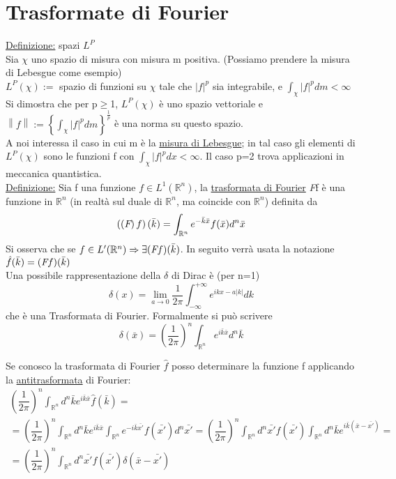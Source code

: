 \documentclass[a4paper,11pt]{report}
\newcommand{\R}{\mathbb{R}}
\newcommand{\Rn}{\mathbb{R}^n}
\newcommand{\fourier}{\emph{F}}
\newcommand{\x}{\bar{x}}
\newcommand{\kk}{\bar{k}}
\begin{document}
\section{Trasformate di Fourier}
\underline{Definizione:} spazi $L^P$ \\
Sia $\chi$ uno spazio di misura con misura m positiva. (Possiamo prendere la misura di Lebesgue come esempio)\\
$L^P(\chi):=$ spazio di funzioni su $\chi$ tale che $|f|^p$ sia integrabile, e $\int_{\chi}|f|^p dm < \infty$\\
Si dimostra che per p$\geq$1, $L^P(\chi)$ è uno spazio vettoriale e $\left\|f\right\| := \left\{ \int_{\chi} |f|^p dm\right\}^{\frac{1}{p}}$ è una norma su questo spazio.\\
A noi interessa il caso in cui m è la \underline{misura di Lebesgue}; in tal caso gli elementi di $L^P(\chi)$ sono le funzioni f con $\int_{\chi}|f|^p dx < \infty$.
Il caso p=2 trova applicazioni in meccanica quantistica.\\
\underline{Definizione:} Sia f una funzione $f\in L^1 (\Rn)$, la \underline{trasformata di Fourier} \fourier f è una funzione in $\Rn$ (in realtà sul duale di $\R^n$, ma coincide con $\R^n$) definita da 
\begin{equation}
\left(\left(\fourier \right)f\right)(\kk) = \int_{\Rn}e^{-\bar{k}\bar{x}}f(\bar{x})d^n\bar{x} 
\end{equation}
Si osserva che se $f\in L'(\Rn) \Rightarrow \exists (\fourier f)(\bar{k})$. In seguito verrà usata la notazione $\hat{f}(\bar{k})=(\fourier f)(\bar{k})$\\
Una possibile rappresentazione della $\delta$ di Dirac è (per n=1)
$$
	\delta(x)=\lim_{a \to 0} \dfrac{1}{2\pi} \int_{-\infty}^{+\infty} e^{ikx-a\left | k\right |}dk
$$
che è una Trasformata di Fourier. Formalmente si può scrivere
\begin{equation}
\delta(\x)=\left(\dfrac{1}{2\pi}\right)^n\int_{\Rn}e^{i\kk\x}d^n\kk
\end{equation}

Se conosco la trasformata di Fourier $\hat{f}$ posso determinare la funzione f applicando la \underline{antitrasformata} di Fourier:
\begin{multline*}
\left(\dfrac{1}{2\pi}\right)^n\int_{\Rn}d^n\bar{k}e^{i\bar{k}\bar{x}}\hat{f}(\bar{k})=\\
=\left(\dfrac{1}{2\pi}\right)^n \int_{\Rn}d^n\bar{k}e^{i\bar{k}\bar{x}}\int_{\Rn}e^{-i\bar{k}\bar{x'}}f(\bar{x'})d^n\bar{x'}= \left(\dfrac{1}{2\pi}\right)^n\int_{\Rn}d^n\bar{x'}f(\bar{x'})\int_{\Rn}d^n\bar{k}e^{i\bar{k}\left(\bar{x}-\bar{x'}\right)}=\\
=\left(\dfrac{1}{2\pi}\right)^n\int_{\Rn}d^n\bar{x'}f(\bar{x'})\delta(\bar{x}-\bar{x'})
\end{multline*}
\end{document}
